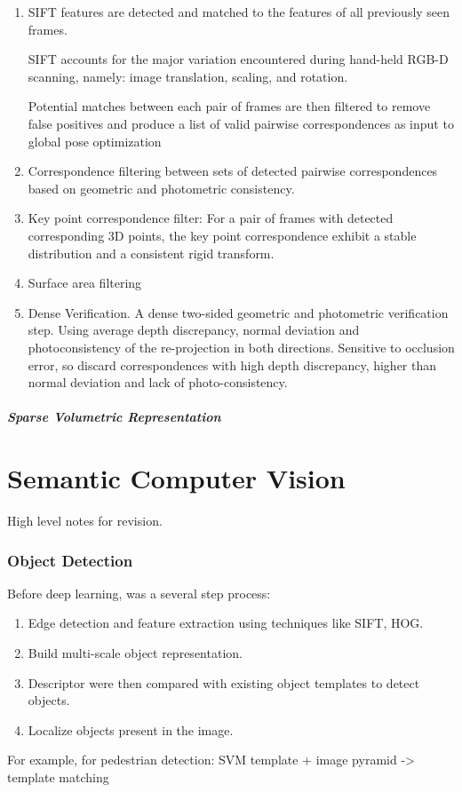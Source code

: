 \begin{enumerate}
\item SIFT features are detected and matched to the features of all previously seen frames. 

SIFT accounts for the major variation encountered during hand-held RGB-D scanning, namely: image translation, scaling, and rotation. 

Potential matches between each pair of frames are then filtered to remove false positives and produce a list of valid pairwise correspondences as input to global pose optimization
%
\item Correspondence filtering between sets of detected pairwise correspondences based on geometric and photometric consistency.
%
\item Key point correspondence filter: For a pair of frames with detected corresponding 3D points, the key point correspondence exhibit a stable distribution and a consistent rigid transform.
%
\item Surface area filtering
%
\item Dense Verification. A dense two-sided geometric and photometric verification step. Using average depth discrepancy, normal deviation and photoconsistency of the re-projection in both directions. Sensitive to occlusion error, so discard correspondences with high depth discrepancy, higher than normal deviation and lack of photo-consistency.
\end{enumerate}

\subsubsection{Sparse Volumetric Representation}

\part{Semantic Computer Vision} 

High level notes for revision.

\section{Object Detection}
Before deep learning, was a several step process: 
\begin{enumerate}
\item Edge detection and feature extraction using techniques like SIFT, HOG.
\item Build multi-scale object representation.
\item Descriptor were then compared with existing object templates to detect objects.
\item Localize objects present in the image.
\end{enumerate}
For example, for pedestrian detection: SVM template + image pyramid -> template matching

